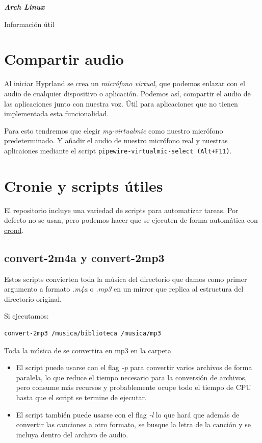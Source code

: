 \documentclass[12pt]{article}
\begin{document}
\pagestyle{empty}
\vspace*{.3\textheight}
{\hfill\Huge\itshape\textcolor{mycolor}{\textbf{Arch Linux}}\par}

{\hfill\Large Información útil\par}

\clearpage

\section{Compartir audio}

Al iniciar Hyprland se crea un \emph{micrófono virtual}, que podemos enlazar con el audio de cualquier dispositivo o aplicación. Podemos así, compartir el audio de las aplicaciones junto con nuestra voz. Útil para aplicaciones que no tienen implementada esta funcionalidad.

\medskip
\noindent Para esto tendremos que elegir \emph{my-virtualmic} como nuestro micrófono predeterminado. Y añadir el audio de nuestro micrófono real y nuestras aplicaiones mediante el script \texttt{pipewire-virtualmic-select (Alt+F11)}.

\section{Cronie y scripts útiles}

El repositorio incluye una variedad de scripts para automatizar tareas. Por defecto no se usan, pero podemos hacer que se ejecuten de forma automática con \href{https://wiki.archlinux.org/title/cron}{crond}.

\subsection{convert-2m4a y convert-2mp3}

Estos scripts convierten toda la música del directorio que damos como primer argumento a formato \emph{.m4a} o \emph{.mp3} en un mirror que replica al estructura del directorio original.

\medskip
\noindent Si ejecutamos:
\begin{verbatim}
convert-2mp3 /musica/biblioteca /musica/mp3
\end{verbatim}
Toda la música de  se convertira en mp3 en la carpeta 
\begin{itemize}
	\item El script puede usarse con el flag \emph{-p} para convertir varios archivos de forma paralela, lo que reduce el tiempo necesario para la conversión de archivos, pero consume más recursos y probablemente ocupe todo el tiempo de CPU hasta que el script se termine de ejecutar.
	\item El script también puede usarse con el flag \emph{-l} lo que hará que además de convertir las canciones a otro formato, se busque la letra de la canción y se incluya dentro del archivo de audio.
\end{itemize}
\end{document}
